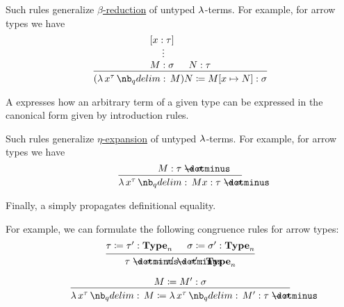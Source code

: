 \begin{remark}
\begin{thmenum}
\begin{thmenum}
      Such rules generalize \hyperref[def:beta_eta_reduction]{\( \beta \)-reduction} of untyped \( \mathrm{\lambda} \)-terms. For example, for arrow types we have
      \begin{equation*}
        \begin{prooftree}
          \hypo{ [x: \tau] }
          \ellipsis {} { M: \sigma }

          \hypo{ N: \tau }
          \infer2{ (\qabs {x^\tau} M) N \coloneqq M[x \mapsto N]: \sigma }.
        \end{prooftree}
      \end{equation*}

       A  expresses how an arbitrary term of a given type can be expressed in the canonical form given by introduction rules.

      Such rules generalize \hyperref[def:beta_eta_reduction]{\( \eta \)-expansion} of untyped \( \mathrm{\lambda} \)-terms. For example, for arrow types we have
      \begin{equation*}
        \begin{prooftree}
          \hypo{ M: \tau \synimplies \sigma }
          \infer1{ \qabs {x^\tau} M x: \tau \synimplies \sigma }.
        \end{prooftree}
      \end{equation*}

       Finally, a  simply propagates definitional equality.

      For example, we can formulate the following congruence rules for arrow types:
      \begin{equation*}
        \begin{prooftree}
          \hypo{ \tau \coloneqq \tau': \op*{Type}_n }
          \hypo{ \sigma \coloneqq \sigma': \op*{Type}_n }
          \infer2{ \tau \synimplies \sigma \coloneqq \tau' \synimplies \sigma': \op*{Type}_n }
        \end{prooftree}
      \end{equation*}

      \begin{paracol}{2}
        \begin{leftcolumn}
          \ParacolAlignmentHack
          \begin{equation*}
            \begin{prooftree}
              \hypo{ M \coloneqq M': \sigma }
              \infer1{ \qabs {x^{\tau}} M \coloneqq \qabs {x^{\tau}} M': \tau \synimplies \sigma }
            \end{prooftree}
          \end{equation*}
        \end{leftcolumn}


\end{paracol}
\end{thmenum}
\end{thmenum}
\end{remark}
